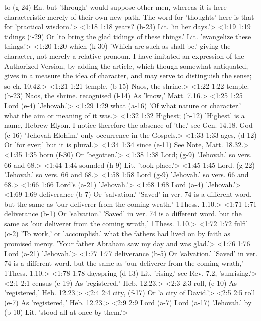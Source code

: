   to (g-24)  En. but 'through' would suppose other men, whereas it is  here characteristic merely of their own new path. The word for  'thoughts' here is that for 'practical wisdom.'>
<1:18 1:18  years? (h-23)  Lit. 'in her days.'>
<1:19 1:19  tidings (i-29)  Or 'to bring the glad tidings of these things.' Lit.  'evangelize these things.'>
<1:20 1:20  which (k-30)  'Which are such as shall be.' giving the character, not  merely a relative pronoun. I have imitated an expression of the  Authorized Version, by adding the article, which though  somewhat antiquated, gives in a measure the idea of character,  and may serve to distinguish the sense; so ch. 10.42.>
<1:21 1:21  temple. (b-15)  Naos, the shrine.>
<1:22 1:22  temple. (b-23)  Naos, the shrine.
  recognised (l-14)  As 'know,' Matt. 7.16.>
<1:25 1:25  Lord (e-4)  'Jehovah.'>
<1:29 1:29  what (a-16)  'Of what nature or character.' what the aim or meaning of it  was.>
<1:32 1:32  Highest; (b-12)  'Highest' is a name, Hebrew Elyon.  I notice therefore the  absence of 'the.' see Gen. 14.18.
  God (c-16)  'Jehovah Elohim.' only occurrence in the Gospels.>
<1:33 1:33  ages, (d-12)  Or 'for ever;' but it is plural.>
<1:34 1:34  since (e-11)  See Note, Matt. 18.32.>
<1:35 1:35  born (f-30)  Or 'begotten.'>
<1:38 1:38  Lord; (g-9)  'Jehovah.' so vers. 66 and 68.>
<1:44 1:44  sounded (h-9)  Lit. 'took place.'>
<1:45 1:45  Lord. (g-22)  'Jehovah.' so vers. 66 and 68.>
<1:58 1:58  Lord (g-9)  'Jehovah.' so vers. 66 and 68.>
<1:66 1:66  Lord's (a-21) 'Jehovah.'>
<1:68 1:68  Lord (a-4) 'Jehovah.'>
<1:69 1:69  deliverance (b-7) Or 'salvation.' 'Saved' in ver. 74 is a different word. but  the same as 'our deliverer from the coming wrath,' 1Thess. 1.10.>
<1:71 1:71  deliverance (b-1) Or 'salvation.' 'Saved' in ver. 74 is a different word. but  the same as 'our deliverer from the coming wrath,' 1Thess. 1.10.>
<1:72 1:72  fulfil (c-2)  'To work,' or 'accomplish.' what the fathers had lived on by  faith as promised mercy. 'Your father Abraham saw my day and  was glad.'>
<1:76 1:76  Lord (a-21)  'Jehovah.'>
<1:77 1:77  deliverance (b-5)  Or 'salvation.' 'Saved' in ver. 74 is a different word. but  the same as 'our deliverer from the coming wrath,' 1Thess. 1.10.>
<1:78 1:78  dayspring (d-13)  Lit. 'rising.' see Rev. 7.2, 'sunrising.'>
<2:1 2:1  census (e-19) As 'registered,' Heb. 12.23.>
<2:3 2:3  roll, (e-10) As 'registered,' Heb. 12.23.>
<2:4 2:4  city, (f-17)  Or 'a city of David.'>
<2:5 2:5  roll (e-7)  As 'registered,' Heb. 12.23.>
<2:9 2:9  Lord (a-7)  Lord (a-17)
  'Jehovah.'
  by (b-10)  Lit. 'stood all at once by them.'>
